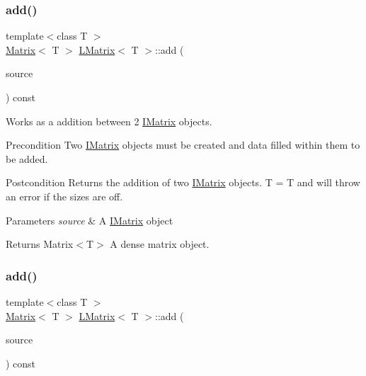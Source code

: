 \subsubsection{\texorpdfstring{add()}{add()}\hspace{0.1cm}{\footnotesize\ttfamily [1/6]}}
{\footnotesize\ttfamily template$<$class T $>$ \\
\mbox{\hyperlink{class_matrix}{Matrix}}$<$ T $>$ \mbox{\hyperlink{class_l_matrix}{L\+Matrix}}$<$ T $>$\+::add (\begin{DoxyParamCaption}\item[{const \mbox{\hyperlink{class_i_matrix}{I\+Matrix}}$<$ \mbox{\hyperlink{class_matrix}{Matrix}}$<$ T $>$, T $>$ \&}]{source }\end{DoxyParamCaption}) const}



Works as a addition between 2 \mbox{\hyperlink{class_i_matrix}{I\+Matrix}} objects. 

\begin{DoxyPrecond}{Precondition}
Two \mbox{\hyperlink{class_i_matrix}{I\+Matrix}} objects must be created and data filled within them to be added. 
\end{DoxyPrecond}
\begin{DoxyPostcond}{Postcondition}
Returns the addition of two \mbox{\hyperlink{class_i_matrix}{I\+Matrix}} objects. T = T and will throw an error if the sizes are off.
\end{DoxyPostcond}

\begin{DoxyParams}{Parameters}
{\em source} & A \mbox{\hyperlink{class_i_matrix}{I\+Matrix}} object \\
\hline
\end{DoxyParams}
\begin{DoxyReturn}{Returns}
Matrix$<$\+T$>$ A dense matrix object. 
\end{DoxyReturn}
\mbox{\label{class_l_matrix_ad6ad95313a5ccca45dc825dce5ff3d13}} 
\subsubsection{\texorpdfstring{add()}{add()}\hspace{0.1cm}{\footnotesize\ttfamily [2/6]}}
{\footnotesize\ttfamily template$<$class T $>$ \\
\mbox{\hyperlink{class_matrix}{Matrix}}$<$ T $>$ \mbox{\hyperlink{class_l_matrix}{L\+Matrix}}$<$ T $>$\+::add (\begin{DoxyParamCaption}\item[{const \mbox{\hyperlink{class_i_matrix}{I\+Matrix}}$<$ \mbox{\hyperlink{class_t_matrix}{T\+Matrix}}$<$ T $>$, T $>$ \&}]{source }\end{DoxyParamCaption}) const}



